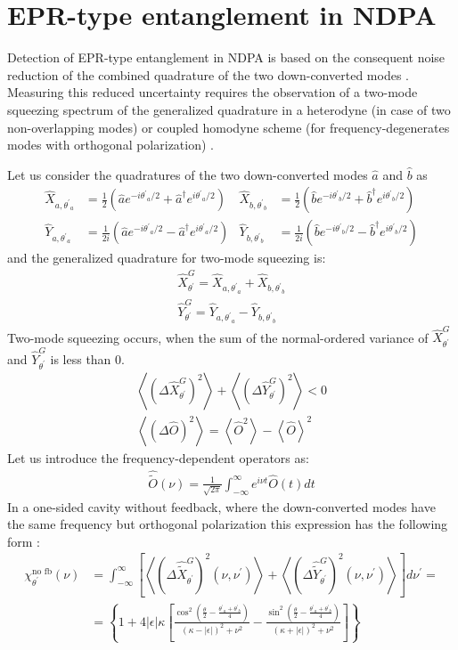 \documentclass[final,review,3p,times,12pt]{elsarticle}
\def\nup{\nu^\prime}
\def\aop{\hat{a}}
\def\adop{\hat{a}^\dagger}
\def\bop{\hat{b}}
\def\bdop{\hat{b}^\dagger}
\def\thetap{\theta^\prime}
\def\thetap{{\theta^\prime}}
\newcommand{\lsz}{\left[}
\newcommand{\rsz}{\right]}
\newcommand{\lk}{\left(}
\newcommand{\rk}{\right)}
\newcommand{\lka}{\left\{}
\newcommand{\rka}{\right\}}
\begin{document}
\section{EPR-type entanglement in NDPA}
Detection of EPR-type entanglement in NDPA is based on the consequent noise reduction of the combined quadrature of the two down-converted modes \cite{Collett1987,Drummond1990}. Measuring this reduced uncertainty requires the observation of a two-mode squeezing spectrum of the generalized quadrature \cite{Caves1985,Schumaker1985} in a heterodyne (in case of two non-overlapping modes) or coupled homodyne scheme (for frequency-degenerates modes with orthogonal polarization) \cite{Drummond1990}.

Let us consider the quadratures of the two down-converted modes $\aop$ and $\bop$ as
\begin{align*}
\hat{X}_{a,\thetap_a}&=\frac{1}{2}\lk\aop e^{-i\thetap_a/2}+\adop e^{i\thetap_a/2}\rk&\hat{X}_{b,\thetap_b}&=\frac{1}{2}\lk\bop e^{-i\thetap_b/2}+\bdop e^{i\thetap_b/2}\rk\\
\hat{Y}_{a,\thetap_a}&=\frac{1}{2i}\lk\aop e^{-i\thetap_a/2}-\adop e^{i\thetap_a/2}\rk&
\hat{Y}_{b,\thetap_b}&=\frac{1}{2i}\lk\bop e^{-i\thetap_b/2}-\bdop e^{i\thetap_b/2}\rk
\end{align*}
and the generalized quadrature for two-mode squeezing is:
\begin{align}
\hat{X}_\thetap^G=\hat{X}_{a,\thetap_a}+\hat{X}_{b,\thetap_b}\\
\hat{Y}_\thetap^G=\hat{Y}_{a,\thetap_a}-\hat{Y}_{b,\thetap_b}
\end{align}
Two-mode squeezing occurs, when the sum of the normal-ordered variance of $\hat{X}_\thetap^G$ and $\hat{Y}_\thetap^G$ is less than $0$.
\begin{align}
\left\langle\lk\Delta\hat{X}_\thetap^G\rk^2\right\rangle+\left\langle\lk\Delta\hat{Y}_\thetap^G\rk^2\right\rangle<0\\
\left\langle\lk\Delta\hat{O}\rk^2\right\rangle=\left\langle\hat{O}^2\right\rangle-\left\langle\hat{O}\right\rangle^2
\end{align}
Let us introduce the frequency-dependent operators as:
\begin{align}
\hat{\tilde{O}}(\nu)=\frac{1}{\sqrt{2\pi}}\int_{-\infty}^\infty e^{i\nu t}\hat{O}(t)dt
\end{align}
In a one-sided cavity without feedback, where the down-converted modes have the same frequency but orthogonal polarization this expression has the following form \cite{Collett1987}:
\begin{align}
\chi_\thetap^\text{no fb}(\nu)&=\int_{-\infty}^\infty\lsz\left\langle\lk\Delta\hat{\tilde{X}}_\thetap^G\rk^2(\nu,\nup)\right\rangle+\left\langle\lk\Delta\hat{\tilde{Y}}_\thetap^G\rk^2(\nu,\nup)\right\rangle\rsz d\nup=\\
&=\lka 1+4|\epsilon|\kappa\lsz\frac{\cos^2{\lk\frac{\theta}{2}-\frac{\thetap_a+\thetap_b}{4}\rk}}{\lk\kappa-|\epsilon|\rk^2+\nu^2}-\frac{\sin^2{\lk\frac{\theta}{2}-\frac{\thetap_a+\thetap_b}{4}\rk}}{\lk\kappa+|\epsilon|\rk^2+\nu^2}\rsz\rka
\end{align}
\end{document}
